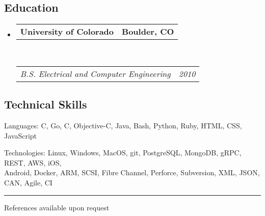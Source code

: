 \documentclass[11pt,letterpaper]{article}
\makeatletter
\newenvironment{indentsection}[1]%
{\begin{list}{}%
	{\setlength{\leftmargin}{#1}}%
	\item[]%
}
{\end{list}}
\newcommand{\headerrow}[2]
{\begin{tabular*}{\linewidth}{l@{\extracolsep{\fill}}r}
	#1 &
	#2 \\
\end{tabular*}}
\newcommand{\CPP}
{C\nolinebreak[4]\hspace{-.05em}\raisebox{.22ex}{\footnotesize\bf ++}}
\makeatother
\begin{document}
\vspace{-0.4em}
\subsection*{Education}

\begin{itemize}
	\parskip=0.1em

	\item 
	\headerrow
		{\textbf{University of Colorado}}
		{\textbf{Boulder, CO}}
	\\
	\headerrow
		{\emph{B.S. Electrical and Computer Engineering}}
		{\emph{2010}}

\end{itemize}


\vspace{-0.4em}
\subsection*{Technical Skills}

\begin{indentsection}{\parindent}
\begin{description*}
	\item[Languages:]
	\CPP, Go, C, Objective-C, Java, Bash, Python, Ruby, HTML, CSS, JavaScript
    \vspace{0.4em}
	\item[Technologies:]
	Linux, Windows, MacOS, git, PostgreSQL, MongoDB, gRPC, REST, AWS, iOS, \\ Android, Docker, ARM, SCSI, Fibre Channel, Perforce, Subversion, XML, JSON, CAN, Agile, CI
\end{description*}


\vspace{0.6em}
\hrule
\vspace{0.4em}
References available upon request
\end{indentsection}
\end{document}
